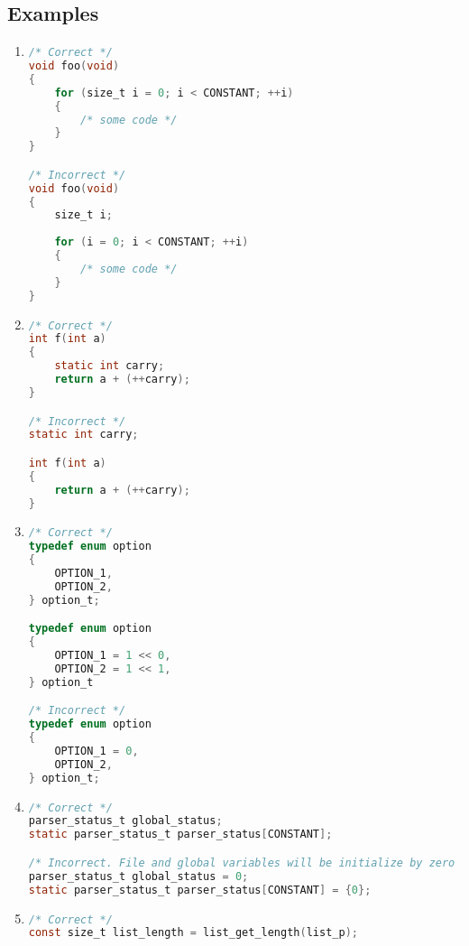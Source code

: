 \subsection{Examples}
\begin{enumerate}
    \item 
\begin{lstlisting}[language=C,style=C99]
/* Correct */
void foo(void)
{
    for (size_t i = 0; i < CONSTANT; ++i)
    {
        /* some code */
    }
}

/* Incorrect */
void foo(void)
{
    size_t i;
    
    for (i = 0; i < CONSTANT; ++i)
    {
        /* some code */
    }
}
\end{lstlisting}
    
    
    \item
\begin{lstlisting}[language=C,style=C99]
/* Correct */
int f(int a)
{
    static int carry;
    return a + (++carry);
}

/* Incorrect */
static int carry;

int f(int a)
{
    return a + (++carry);
}
\end{lstlisting}

    \item
\begin{lstlisting}[language=C,style=C99]
/* Correct */
typedef enum option
{
    OPTION_1,
    OPTION_2,
} option_t;

typedef enum option
{
    OPTION_1 = 1 << 0,
    OPTION_2 = 1 << 1,
} option_t

/* Incorrect */
typedef enum option
{
    OPTION_1 = 0,
    OPTION_2,
} option_t;

\end{lstlisting}

    \item 
\begin{lstlisting}[language=C,style=C99]
/* Correct */
parser_status_t global_status;
static parser_status_t parser_status[CONSTANT];

/* Incorrect. File and global variables will be initialize by zero by compiler. Do not take a compiler job */
parser_status_t global_status = 0;
static parser_status_t parser_status[CONSTANT] = {0};
\end{lstlisting}
    
    \item 
\begin{lstlisting}[language=C,style=C99]
/* Correct */
const size_t list_length = list_get_length(list_p);


\end{lstlisting}
\end{enumerate}
